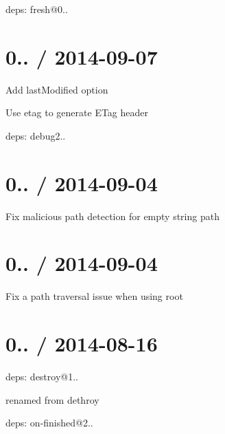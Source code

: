\begin{DoxyItemize}
\item deps\+: fresh@0..
\end{DoxyItemize}

\section*{0.. / 2014-\/09-\/07 }


\begin{DoxyItemize}
\item Add {\ttfamily last\+Modified} option
\item Use {\ttfamily etag} to generate {\ttfamily E\+Tag} header
\item deps\+: debug2..
\end{DoxyItemize}

\section*{0.. / 2014-\/09-\/04 }


\begin{DoxyItemize}
\item Fix malicious path detection for empty string path
\end{DoxyItemize}

\section*{0.. / 2014-\/09-\/04 }


\begin{DoxyItemize}
\item Fix a path traversal issue when using {\ttfamily root}
\end{DoxyItemize}

\section*{0.. / 2014-\/08-\/16 }


\begin{DoxyItemize}
\item deps\+: destroy@1..
\begin{DoxyItemize}
\item renamed from dethroy
\end{DoxyItemize}
\item deps\+: on-\/finished@2..
\end{DoxyItemize}


